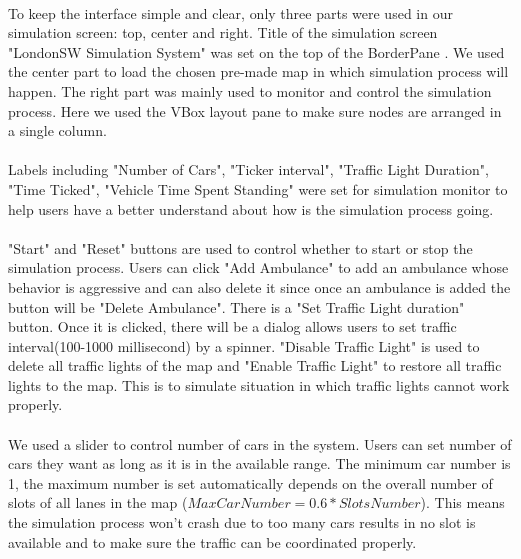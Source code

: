 \documentclass[a4paper,11pt,titlepage]{article}
\begin{document}
\paragraph{}
To keep the interface simple and clear, only three parts were used in our simulation screen: top, center and right. Title of the simulation screen "LondonSW Simulation System" was set on the top of the BorderPane . We used the center part to load the chosen pre-made map in which simulation process will happen. The right part was mainly used to monitor and control the simulation process. Here we used the VBox layout pane to make sure nodes are arranged in a single column. 
\paragraph{}
Labels including "Number of Cars", "Ticker interval", "Traffic Light Duration", "Time Ticked", "Vehicle Time Spent Standing" were set for simulation monitor to help users have a better understand about how is the simulation process going. 
\paragraph{}
"Start" and "Reset" buttons are used to control whether to start or stop the simulation process. Users can click "Add Ambulance" to add an ambulance whose behavior is aggressive and can also delete it since once an ambulance is added the button will be "Delete Ambulance". There is a "Set Traffic Light duration" button. Once it is clicked, there will be a dialog allows users to set traffic interval(100-1000 millisecond) by a spinner. "Disable Traffic Light" is used to delete all traffic lights of the map and "Enable Traffic Light" to restore all traffic lights to the map. This is to simulate situation in which traffic lights cannot work properly. 
\paragraph{}
We used a slider to control number of cars in the system. Users can set number of cars they want as long as  it is in the available range. The minimum car number is 1, the maximum number is set automatically depends on the overall number of slots of all lanes in the map ($MaxCarNumber=0.6*SlotsNumber$). This means the simulation process won't crash due to too many cars results in no slot is available and to make sure the traffic can be coordinated properly. 
\end{document}

